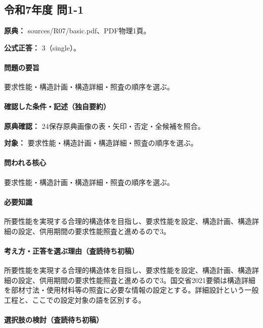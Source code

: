\subsection{令和7年度 問1-1}
\label{q:r07-reg-basic-1-1}

\noindent\textbf{原典：} sources/R07/basic.pdf、PDF物理1頁。

\textbf{公式正答：} 3（single）。

\paragraph{問題の要旨} 要求性能・構造計画・構造詳細・照査の順序を選ぶ。

\paragraph{確認した条件・記述（独自要約）}\mbox{}\par

\noindent\textbf{原典確認：} 24保存原典画像の表・矢印・否定・全候補を照合。\par

\noindent\textbf{対象：} 要求性能・構造計画・構造詳細・照査の順序を選ぶ。\par

\paragraph{問われる核心} 要求性能・構造計画・構造詳細・照査の順序を選ぶ。

\paragraph{必要知識} 所要性能を実現する合理的構造体を目指し、要求性能を設定、構造計画、構造詳細の設定、供用期間の要求性能照査と進めるので3。

\paragraph{考え方・正答を選ぶ理由（査読待ち初稿）} 所要性能を実現する合理的構造体を目指し、要求性能を設定、構造計画、構造詳細の設定、供用期間の要求性能照査と進めるので3。国交省2021要領は構造詳細を部材寸法・使用材料等の照査に必要な情報の設定とする。詳細設計という一般工程と、ここでの設定対象の語を区別する。

\paragraph{選択肢の検討（査読待ち初稿）}\mbox{}\par

